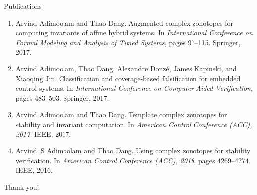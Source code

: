 \begin{frame}{Publications}
\begin{enumerate}
\item Arvind Adimoolam and Thao Dang.
\newblock Augmented complex zonotopes for computing invariants of affine hybrid
  systems.
\newblock In {\em International Conference on Formal Modeling and Analysis of
  Timed Systems}, pages 97--115. Springer, 2017.

\item Arvind Adimoolam, Thao Dang, Alexandre Donz{\'e}, James Kapinski, and Xiaoqing
  Jin.
\newblock Classification and coverage-based falsification for embedded control
  systems.
\newblock In {\em International Conference on Computer Aided Verification},
  pages 483--503. Springer, 2017.


\item %
Arvind Adimoolam and Thao Dang.
\newblock Template complex zonotopes for stability and invariant computation.
\newblock In {\em American Control Conference (ACC), 2017}. IEEE, 2017.


\item %
Arvind~S Adimoolam and Thao Dang.
\newblock Using complex zonotopes for stability verification.
\newblock In {\em American Control Conference (ACC), 2016}, pages 4269--4274.
  IEEE, 2016.
\end{enumerate}
\end{frame}


\begin{frame}{}
\center
{\Huge {\color{blue} Thank you!}}
\end{frame}






